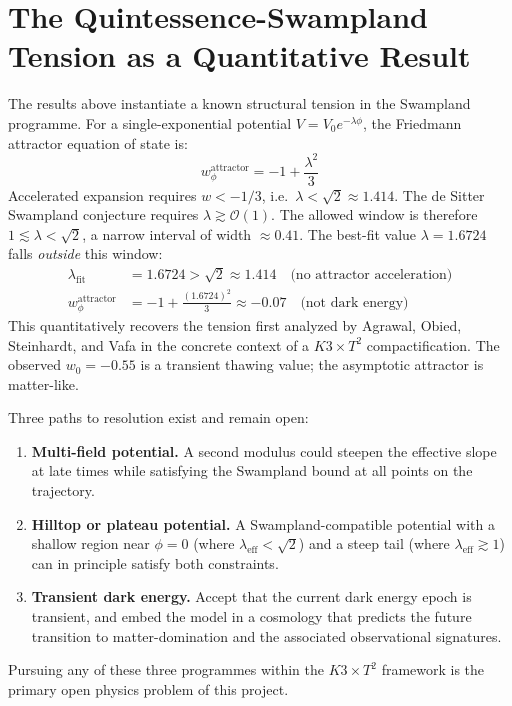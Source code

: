 \documentclass[12pt]{article}
\begin{document}
\section{The Quintessence-Swampland Tension as a Quantitative Result}\label{sec:swampland_tension}

The results above instantiate a known structural tension in the Swampland programme. For a
single-exponential potential $V = V_0 e^{-\lambda\phi}$, the Friedmann attractor equation of
state is:
\begin{equation}
w_\phi^\mathrm{attractor} = -1 + \frac{\lambda^2}{3}
\end{equation}
Accelerated expansion requires $w < -1/3$, i.e.\ $\lambda < \sqrt{2}\approx 1.414$.
The de Sitter Swampland conjecture requires $\lambda \gtrsim \mathcal{O}(1)$.
The allowed window is therefore $1 \lesssim \lambda < \sqrt{2}$, a narrow interval of
width $\approx 0.41$. The best-fit value $\lambda = 1.6724$ falls \emph{outside} this
window:
\begin{align}
\lambda_\mathrm{fit} &= 1.6724 > \sqrt{2} \approx 1.414 \quad \text{(no attractor acceleration)} \\
w_\phi^\mathrm{attractor} &= -1 + \frac{(1.6724)^2}{3} \approx -0.07 \quad \text{(not dark energy)}
\end{align}
This quantitatively recovers the tension first analyzed by Agrawal, Obied, Steinhardt, and
Vafa \cite{agrawal2018cosmological} in the concrete context of a $K3\times T^2$
compactification. The observed $w_0 = -0.55$ is a transient thawing value; the asymptotic
attractor is matter-like.

Three paths to resolution exist and remain open:
\begin{enumerate}
  \item \textbf{Multi-field potential.} A second modulus could steepen the effective slope
    at late times while satisfying the Swampland bound at all points on the trajectory.
  \item \textbf{Hilltop or plateau potential.} A Swampland-compatible potential with a
    shallow region near $\phi = 0$ (where $\lambda_\mathrm{eff} < \sqrt{2}$) and a steep
    tail (where $\lambda_\mathrm{eff} \gtrsim 1$) can in principle satisfy both constraints.
  \item \textbf{Transient dark energy.} Accept that the current dark energy epoch is
    transient, and embed the model in a cosmology that predicts the future transition
    to matter-domination and the associated observational signatures.
\end{enumerate}
Pursuing any of these three programmes within the $K3\times T^2$ framework is the primary
open physics problem of this project.
\end{document}
